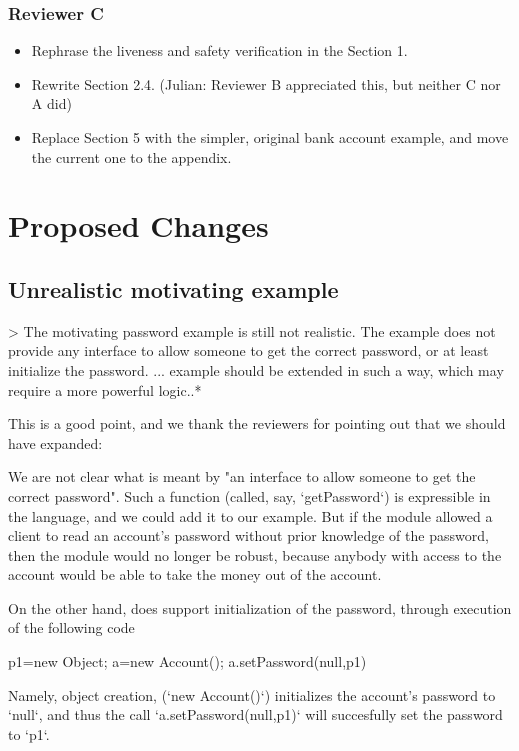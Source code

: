 \documentclass[11pt]{amsart}
\begin{document}
\subsubsection*{Reviewer C}
\begin{itemize}
\item Rephrase the liveness and safety verification in the Section 1.
\item Rewrite Section 2.4. (Julian: Reviewer B appreciated this, but neither C nor A did)
\item Replace Section 5 with the simpler, original bank account example, and move the current one to the appendix.
\end{itemize}


  
\section{Proposed Changes}

\subsection{Unrealistic motivating example}

> The motivating password example is still not realistic. The example does not 
provide any interface to allow someone to get the correct password, or at 
least initialize the password. ... example should be extended in such a way, 
which may require a more powerful logic..*

This is a good point, and we thank the reviewers for pointing out that we should
have expanded:

We are not clear what is meant by "an interface to allow someone to get the 
correct password". Such a function (called, say, `getPassword`) is expressible
in the language, and we could add it to our example. But if the module allowed 
a client to read an account's password without prior knowledge of the password, 
then the module would no longer be robust, because anybody with access to
the account would be able to take the money out of the account. 

On the other hand, \ModC does support initialization of the password, through
execution of the following code

	p1=new Object; a=new Account(); a.setPassword(null,p1)

Namely, object creation, (`new Account()`) initializes the account's password
to `null`, and thus the call `a.setPassword(null,p1)` will succesfully set the password
to `p1`. 
\end{document}
